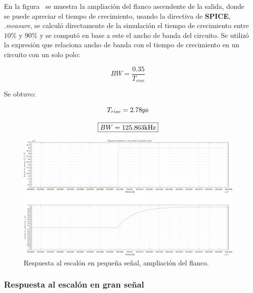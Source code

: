 En la figura~ se muestra la ampliación del flanco ascendente de la salida, donde se puede apreciar el tiempo de crecimiento, usando la directiva de \textbf{SPICE}, \textit{.measure}, se calculó directamente de la simulación el tiempo de crecimiento entre $10\%$ y $90\%$ y se computó en base a este el ancho de banda del circuito. Se utilizó la expresión que relaciona ancho de banda con el tiempo de crecimiento en un circuito con un solo polo:

\begin{equation}
BW = \frac{0.35}{T_{rise}}
\end{equation}

Se obtuvo:

\begin{equation}
T_{rise} = 2.78 \si[per-mode=symbol]{\micro\second}
\end{equation}


\begin{equation}
\boxed{BW = 125.863 \si[per-mode=symbol]{\kilo\hertz}}
\end{equation}



\begin{figure}[H] %
\begin{center}
\includegraphics[width=0.9 \textwidth, angle=90]{./img/puntos/P11f_I_step_small_signal_zoom.png}
\caption{\label{fig:fig_step_small_signal_zoom}\footnotesize{Respuesta al escalón en pequeña señal, ampliación del flanco.}}
\end{center}
\end{figure}

\clearpage

\subsubsection{Respuesta al escalón en gran señal}

